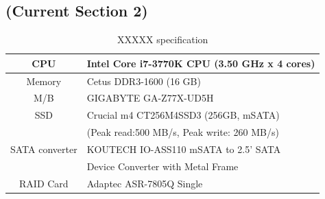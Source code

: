 

\subsection{(Current Section 2)}

\begin{table}[h]
\caption{\small XXXXX specification}
\label{tbl:spec}
\begin{center}
\begin{tabular}{|c|l|}
  \hline
  \cellcolor{lightgray} CPU   & Intel Core i7-3770K CPU (3.50 GHz x 4 cores)\\
  \hline
  \cellcolor{lightgray} Memory   & Cetus DDR3-1600 (16 GB)    \\
  \hline
  \cellcolor{lightgray} M/B   & GIGABYTE GA-Z77X-UD5H \\
  \hline
  \cellcolor{lightgray} SSD          & Crucial m4 CT256M4SSD3 (256GB,
  mSATA)\\
  \cellcolor{lightgray}             & (Peak read:500 MB/s, Peak write: 260
MB/s)
             \\
             \hline
             \cellcolor{lightgray} SATA converter & KOUTECH IO-ASS110 mSATA to 2.5' SATA  \\
             \cellcolor{lightgray}& Device Converter with Metal Frame \\
             \hline
             \cellcolor{lightgray} RAID Card    & Adaptec ASR-7805Q Single\\
             \hline

\end{tabular}
\end{center}
\end{table}


